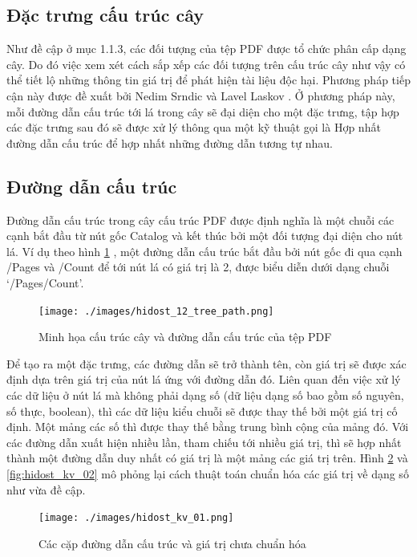 \documentclass[./../main.tex]{subfiles}
\begin{document}
\subsection{Đặc trưng cấu trúc cây}
Như đề cập ở mục 1.1.3, các đối tượng của tệp PDF được tổ chức phân cấp dạng cây. Do đó việc xem xét cách sắp xếp các đối tượng trên cấu trúc cây như vậy có thể tiết lộ những thông tin giá trị để phát hiện tài liệu độc hại. Phương pháp tiếp cận này được đề xuất bởi Nedim Srndic và Lavel Laskov \cite{hidost}. Ở phương pháp này, mỗi đường dẫn cấu trúc tới lá trong cây sẽ đại diện cho một đặc trưng, tập hợp các đặc trưng sau đó sẽ được xử lý thông qua một kỹ thuật gọi là Hợp nhất đường dẫn cấu trúc để hợp nhất những đường dẫn tương tự nhau.

\subsection*{Đường dẫn cấu trúc}

Đường dẫn cấu trúc trong cây cấu trúc PDF được định nghĩa là một chuỗi các cạnh bắt đầu từ nút gốc Catalog và kết thúc bởi một đối tượng đại diện cho nút lá. Ví dụ theo hình \ref{fig:hidost_12_tree_path} , một đường dẫn cấu trúc bắt đầu bởi nút gốc đi qua cạnh /Pages và /Count để tới nút lá có giá trị là 2, được biểu diễn dưới dạng chuỗi ‘\slash Pages\slash Count’.

\begin{figure}[H]
	\centering
	\texttt{[image: ./images/hidost\_12\_tree\_path.png]}
	\caption{Minh họa cấu trúc cây và đường dẫn cấu trúc của tệp PDF}
	\label{fig:hidost_12_tree_path}
\end{figure}

Để tạo ra một đặc trưng, các đường dẫn sẽ trở thành tên, còn giá trị sẽ được xác định dựa trên giá trị của nút lá ứng với đường dẫn đó. Liên quan đến việc xử lý các dữ liệu ở nút lá mà không phải dạng số (dữ liệu dạng số bao gồm số nguyên, số thực, boolean), thì các dữ liệu kiểu chuỗi sẽ được thay thế bởi một giá trị cố định. Một mảng các số thì được thay thế bằng trung bình cộng của mảng đó. Với các đường dẫn xuất hiện nhiều lần, tham chiếu tới nhiều giá trị, thì sẽ hợp nhất thành một đường dẫn duy nhất có giá trị là một mảng các giá trị trên. Hình \ref{fig:hidost_kv_01} và \ref{fig:hidost_kv_02} mô phỏng lại cách thuật toán chuẩn hóa các giá trị về dạng số như vừa đề cập.

\begin{figure}[H]
	\centering
	\texttt{[image: ./images/hidost\_kv\_01.png]}
	\caption{Các cặp đường dẫn cấu trúc và giá trị chưa chuẩn hóa}
	\label{fig:hidost_kv_01}
\end{figure}
\end{document}
